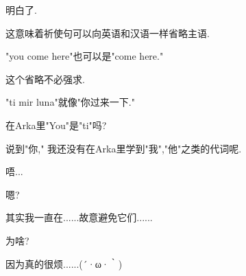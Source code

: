 明白了.

这意味着祈使句可以向英语和汉语一样省略主语.

"you come here"也可以是"come here."


这个省略不必强求.

"ti mir luna"就像"你过来一下."


在Arka里"You"是"ti"吗?

说到"你," 我还没有在Arka里学到"我","他"之类的代词呢.


唔...

嗯?


其实我一直在......故意避免它们......


为啥?


因为真的很烦......(´·ω·｀)







